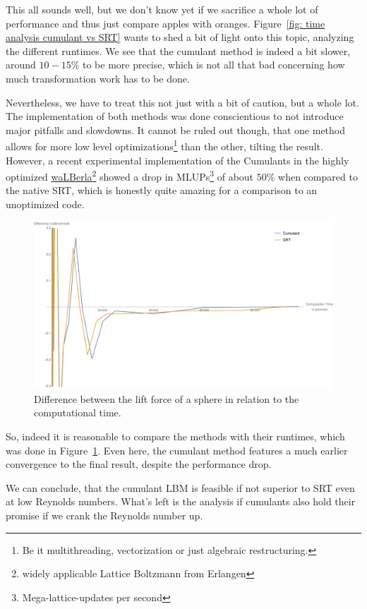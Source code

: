 This all sounds well, but we don't know yet if we sacrifice a whole lot of performance and thus just compare apples with oranges.
Figure~\ref{fig: time analysis cumulant vs SRT} wants to shed a bit of light onto this topic, analyzing the different runtimes.
We see that the cumulant method is indeed a bit slower, around $10-15\%$ to be more precise, which is not all that bad concerning how much transformation work has to be done.

Nevertheless, we have to treat this not just with a bit of caution, but a whole lot.
The implementation of both methods was done conscientious to not introduce major pitfalls and slowdowns.
It cannot be ruled out though, that one method allows for more low level optimizations\footnote{Be it multithreading, vectorization or just algebraic restructuring.} than the other, tilting the result.
However, a recent experimental implementation of the Cumulants in the highly optimized \href{http://walberla.net/index.html}{waLBerla}\footnote{widely applicable Lattice Boltzmann from Erlangen} showed a drop in MLUPs\footnote{Mega-lattice-updates per second} of about $50\%$ when compared to the native SRT, which is honestly quite amazing for a comparison to an unoptimized code.

\begin{figure}
  \centering
  \includegraphics[width=\linewidth]{../figures/schaeferTurekLift_timeDifference.pdf} %
  \caption{Difference between the lift force of a sphere in relation to the computational time.}
\label{fig: schaefer turek time difference}
\end{figure}

So, indeed it is reasonable to compare the methods with their runtimes, which was done in Figure~\ref{fig: schaefer turek time difference}.
Even here, the cumulant method features a much earlier convergence to the final result, despite the performance drop.


We can conclude, that the cumulant LBM is feasible if not superior to SRT even at low Reynolds numbers.
What's left is the analysis if cumulants also hold their promise if we crank the Reynolds number up.
